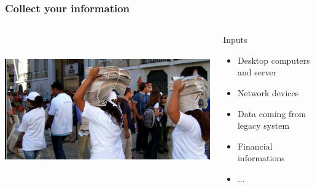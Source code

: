 \documentclass{beamer}
\begin{document}
\begin{frame}

    \frametitle{Collect your information}

 \begin{columns}
 \begin{column}{0.34\textwidth}
    \includegraphics[height=6.5cm]{pics/information.jpg}
 \end{column}
 \begin{column}{0.90\textwidth}
    \begin{block}{Inputs}
        \begin{itemize}
            \item Desktop computers and server
            \item Network devices
            \item Data coming from legacy system
            \item Financial informations
            \item ...
        \end{itemize}
    \end{block}

 \end{column}
\end{columns}


\end{frame}
\end{document}
